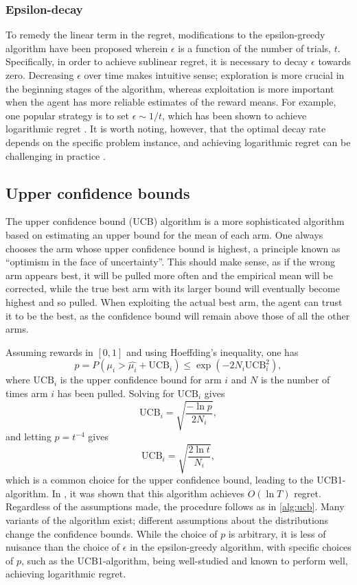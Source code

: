 \subsubsection{Epsilon-decay}
To remedy the linear term in the regret, modifications to the epsilon-greedy algorithm have been proposed wherein $\epsilon$ is a function of the number of trials, $t$.
Specifically, in order to achieve sublinear regret, it is necessary to decay $\epsilon$ towards zero.
Decreasing $\epsilon$ over time makes intuitive sense; exploration is more crucial in the beginning stages of the algorithm, whereas exploitation is more important when the agent has more reliable estimates of the reward means.
For example, one popular strategy is to set $\epsilon \sim 1/t$, which has been shown to achieve logarithmic regret \cite{auer2002}.
It is worth noting, however, that the optimal decay rate depends on the specific problem instance, and achieving logarithmic regret can be challenging in practice \cite{bubeck2012}.

\subsection{Upper confidence bounds}
The upper confidence bound (UCB) algorithm is a more sophisticated algorithm based on estimating an upper bound for the mean of each arm.
One always chooses the arm whose upper confidence bound is highest, a principle known as \enquote{optimism in the face of uncertainty}.
This should make sense, as if the wrong arm appears best, it will be pulled more often and the empirical mean will be corrected, while the true best arm with its larger bound will eventually become highest and so pulled.
When exploiting the actual best arm, the agent can trust it to be the best, as the confidence bound will remain above those of all the other arms.

Assuming rewards in $[0,1]$ and using Hoeffding's inequality, one has
\begin{equation}
    p
    = P \left(\mu_i > \hat{\mu_i} + \text{UCB}_i \right)
    \leq \exp \left(-2N_i \text{UCB}_i^2 \right),
\end{equation}
where $\text{UCB}_i$ is the upper confidence bound for arm $i$ and $N$ is the number of times arm $i$ has been pulled.
Solving for $\text{UCB}_i$ gives
\begin{equation}
    \text{UCB}_i = \sqrt{\frac{-\ln p}{2N_i}},
\end{equation}
and letting $p = t^{-4}$ gives
\begin{equation}
    \text{UCB}_i = \sqrt{\frac{2 \ln t}{N_i}},
\end{equation}
which is a common choice for the upper confidence bound, leading to the UCB1-algorithm.
In \cite{auer2002}, it was shown that this algorithm achieves $O(\ln T)$ regret.
Regardless of the assumptions made, the procedure follows as in \cref{alg:ucb}.
Many variants of the algorithm exist; different assumptions about the distributions change the confidence bounds.
While the choice of $p$ is arbitrary, it is less of nuisance than the choice of $\epsilon$ in the epsilon-greedy algorithm, with specific choices of $p$, such as the UCB1-algorithm, being well-studied and known to perform well, achieving logarithmic regret.

